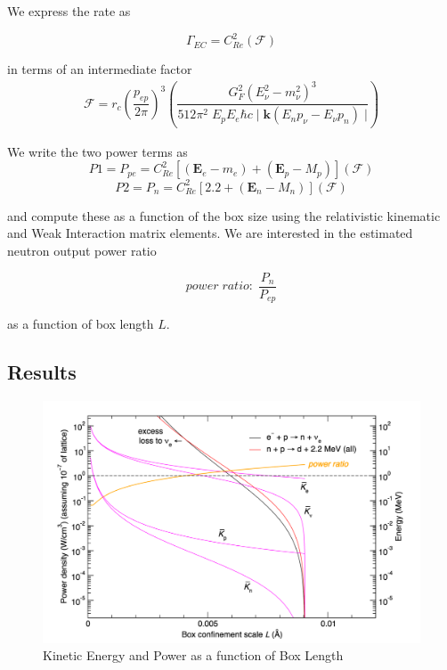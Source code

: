\documentclass[%
 aip,
 jmp,%
 amsmath,amssymb,
 reprint,%
]{revtex4-1}
\begin{document}
We  express the rate as

$$\Gamma_{EC} = C^{2}_{Re}(\mathcal{F})$$

in terms of an intermediate factor
\begin{multline}
\mathcal{F}=r_{c}\left(\dfrac{p_{ep}}{2\pi}\right)^{3}\left(\dfrac{G_{F}^{2}(E_{\nu}^{2}-m_{\nu}^{2})^{3}}{512\pi^{2}\;E_{p}E_{e}\hbar c\;\big\vert\; \mathbf{k}(E_{n}p_{\nu}-E_{\nu}p_{n})\;\big\vert}\right)
\end{multline}

We write the two power terms as
$$P1 = P_{pe}=C^{2}_{Re}\left[(\mathbf{E}_{e}-m_{e})+(\mathbf{E}_{p}-M_{p})\right]\left(\mathcal{F}\right)$$
$$P2 =P_{n}=C^{2}_{Re}\left[2.2+(\mathbf{E}_{n}-M_{n})\right]\left(\mathcal{F}\right)$$

and compute these as a function of the box size using the relativistic kinematic and Weak Interaction matrix elements.  We are interested in the estimated neutron output power ratio 

$$power\;ratio:\;\dfrac{P_{n}}{P_{ep}}$$

as a function of box length $L$.

\subsection{Results}

\begin{figure}
 \begin{minipage}{\linewidth}
   \includegraphics[scale=0.5]{img/results.png}
   \caption{Kinetic Energy and Power as a function of Box Length}
  \label{fig:results}
\end{minipage}
\end{figure}
\end{document}
